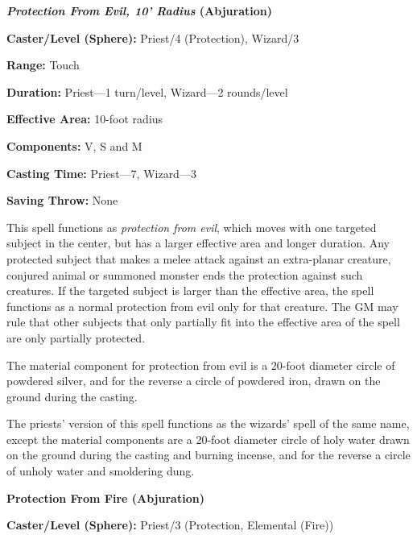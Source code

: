 \begin{multicols}{2}
\vspace{1em}

\noindent
\begin{minipage}{\columnwidth}

\noindent \textbf{\textit{Protection From Evil, 10' Radius} (Abjuration)}

\noindent \textbf{Caster/Level (Sphere):} Priest/4 (Protection), Wizard/3

\noindent \textbf{Range:} Touch

\noindent \textbf{Duration:} Priest---1 turn/level, Wizard---2 rounds/level

\noindent \textbf{Effective Area:} 10-foot radius

\noindent \textbf{Components:} V, S and M

\noindent \textbf{Casting Time:} Priest---7, Wizard---3

\noindent \textbf{Saving Throw:} None

\end{minipage}

This spell functions as \textit{protection from evil}, which moves with one targeted subject in the center, but has a larger effective area and longer duration.  Any protected subject that makes a melee attack against an extra-planar creature, conjured animal or summoned monster ends the protection against such creatures.  If the targeted subject is larger than the effective area, the spell functions as a normal protection from evil only for that creature.  The GM may rule that other subjects that only partially fit into the effective area of the spell are only partially protected.

The material component for protection from evil is a 20-foot diameter circle of powdered silver, and for the reverse a circle of powdered iron, drawn on the ground during the casting.

The priests' version of this spell functions as the wizards' spell of the same name, except the material components are a 20-foot diameter circle of holy water drawn on the ground during the casting and burning incense, and for the reverse a circle of unholy water and smoldering dung.
 
\vspace{1em}

\noindent
\begin{minipage}{\columnwidth}

\noindent \textbf{Protection From Fire (Abjuration)}

\noindent \textbf{Caster/Level (Sphere):} Priest/3 (Protection, Elemental (Fire))


\end{minipage}
\end{multicols}

